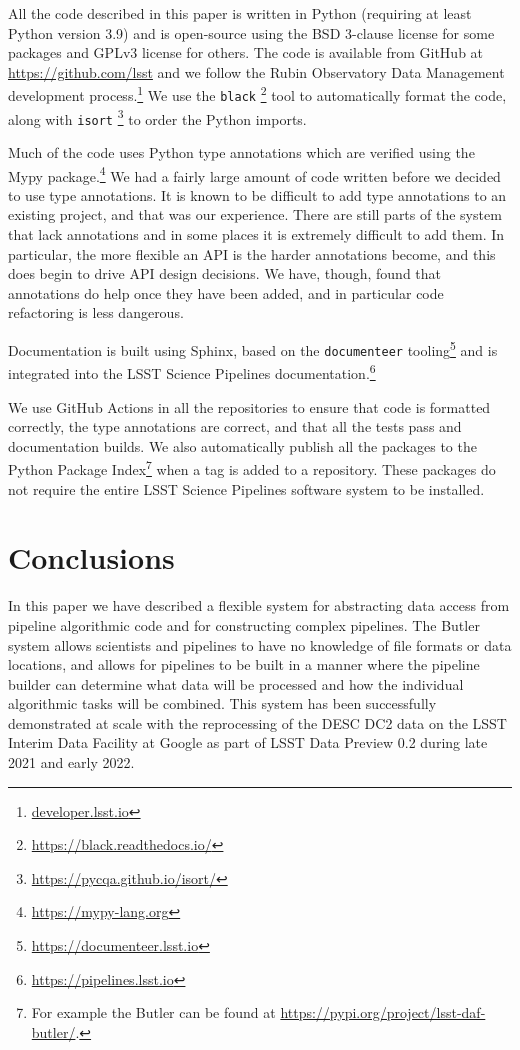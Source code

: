 \documentclass[]{spie}
\begin{document}
\setcounter{footnote}{0}  %

All the code described in this paper is written in Python (requiring at least Python version 3.9\cite{2020ASPC..522..541J}) and is open-source using the BSD 3-clause license for some packages and GPLv3 license for others.
The code is available from GitHub at \url{https://github.com/lsst} and we follow the Rubin Observatory Data Management development process.\footnote{\url{developer.lsst.io}}\cite{2018SPIE10707E..09J}
We use the \texttt{black} \footnote{\url{https://black.readthedocs.io/}} tool to automatically format the code, along with \texttt{isort} \footnote{\url{https://pycqa.github.io/isort/}} to order the Python imports.

Much of the code uses Python type annotations which are verified using the Mypy package.\footnote{\url{https://mypy-lang.org}}
We had a fairly large amount of code written before we decided to use type annotations.
It is known to be difficult to add type annotations to an existing project\cite{10.1109/ASE51524.2021.9678947}, and that was our experience.
There are still parts of the system that lack annotations and in some places it is extremely difficult to add them.
In particular, the more flexible an API is the harder annotations become, and this does begin to drive API design decisions.
We have, though, found that annotations do help once they have been added, and in particular code refactoring is less dangerous.

Documentation is built using Sphinx, based on the \texttt{documenteer} tooling\footnote{\url{https://documenteer.lsst.io}} and is integrated into the LSST Science Pipelines documentation.\footnote{\url{https://pipelines.lsst.io}}

We use GitHub Actions in all the repositories to ensure that code is formatted correctly, the type annotations are correct, and that all the tests pass and documentation builds.
We also automatically publish all the packages to the Python Package Index\footnote{For example the Butler can be found at \url{https://pypi.org/project/lsst-daf-butler/}.} when a tag is added to a repository.
These packages do not require the entire LSST Science Pipelines software system to be installed.

\section{Conclusions}

In this paper we have described a flexible system for abstracting data access from pipeline algorithmic code and for constructing complex pipelines.
The Butler system allows scientists and pipelines to have no knowledge of file formats or data locations, and allows for pipelines to be built in a manner where the pipeline builder can determine what data will be processed and how the individual algorithmic tasks will be combined.
This system has been successfully demonstrated at scale with the reprocessing of the DESC DC2 data\cite{2021ApJS..253...31L} on the LSST Interim Data Facility at Google \cite{2021arXiv211115030O} as part of LSST Data Preview 0.2 \cite{RTN-001} during late 2021 and early 2022.
\end{document}
